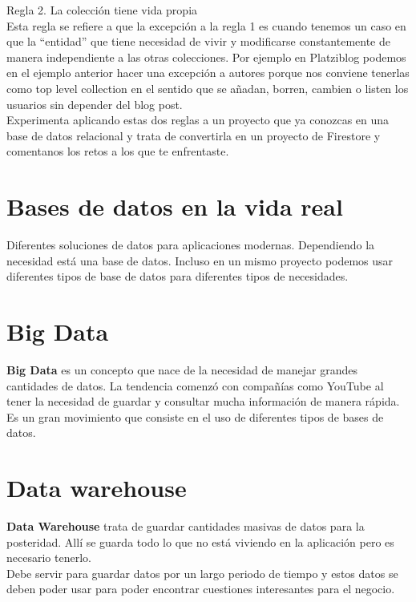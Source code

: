 \documentclass{article}
\begin{document}
Regla 2. La colección tiene vida propia\\

Esta regla se refiere a que la excepción a la regla 1 es cuando tenemos un caso
en que la “entidad” que tiene necesidad de vivir y modificarse constantemente
de manera independiente a las otras colecciones. Por ejemplo en Platziblog
podemos en el ejemplo anterior hacer una excepción a autores porque nos
conviene tenerlas como top level collection en el sentido que se añadan,
borren, cambien o listen los usuarios sin depender del blog post.\\

Experimenta aplicando estas dos reglas a un proyecto que ya conozcas en una
base de datos relacional y trata de convertirla en un proyecto de Firestore y
comentanos los retos a los que te enfrentaste.

\section{Bases de datos en la vida real}%
Diferentes soluciones de datos para aplicaciones modernas. Dependiendo la
necesidad está una base de datos. Incluso en un mismo proyecto podemos usar
diferentes tipos de base de datos para diferentes tipos de necesidades.\\

\section{Big Data}%
\textbf{Big Data} es un concepto que nace de la necesidad de manejar grandes
cantidades de datos. La tendencia comenzó con compañías como YouTube al tener
la necesidad de guardar y consultar mucha información de manera rápida.\\

Es un gran movimiento que consiste en el uso de diferentes tipos de bases de
datos.


\section{Data warehouse}%
\textbf{Data Warehouse} trata de guardar cantidades masivas de datos para la
posteridad. Allí se guarda todo lo que no está viviendo en la aplicación pero
es necesario tenerlo.\\

Debe servir para guardar datos por un largo periodo de tiempo y estos datos se
deben poder usar para poder encontrar cuestiones interesantes para el
negocio.\\
\end{document}
